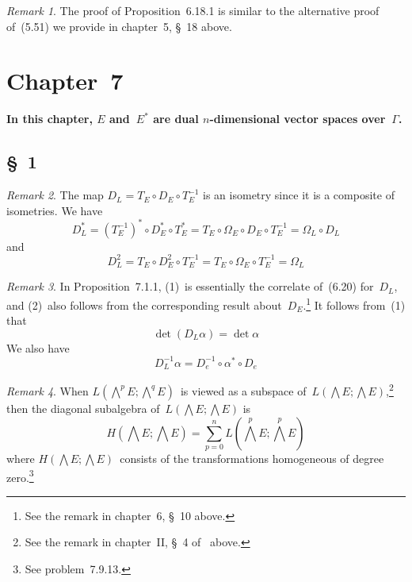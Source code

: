\documentclass[letterpaper,12pt]{article}
\newcommand{\after}{\circ}
\newcommand{\bigeprod}{\bigwedge}
\newcommand{\medeprod}{{\textstyle\bigeprod}}
\theoremstyle{definition}
\theoremstyle{remark}
\newtheorem*{rmk}{Remark}
\begin{document}
\begin{rmk}
The proof of Proposition~6.18.1 is similar to the alternative proof of~(5.51) we provide in chapter~5, \S~18 above.
\end{rmk}

\newpage
\section*{Chapter~7}
{\boldmath\textbf{In this chapter, \(E\) and~\(E^*\) are dual \(n\)-dimensional vector spaces over~\(\Gamma\).}}

\subsection*{\S~1}
\begin{rmk}
The map \(D_L=T_E\after D_E\after T_E^{-1}\) is an isometry since it is a composite of isometries. We have
\[D_L^*=(T_E^{-1})^*\after D_E^*\after T_E^*=T_E\after\Omega_E\after D_E\after T_E^{-1}=\Omega_L\after D_L\]
and
\[D_L^2=T_E\after D_E^2\after T_E^{-1}=T_E\after\Omega_E\after T_E^{-1}=\Omega_L\]
\end{rmk}

\begin{rmk}
In Proposition~7.1.1, (1)~is essentially the correlate of~(6.20) for~\(D_L\), and (2)~also follows from the corresponding result about~\(D_E\).\footnote{See the remark in chapter~6, \S~10 above.} It follows from~(1) that
\[\det(D_L\alpha)=\det\alpha\]
We also have
\[D_L^{-1}\alpha=D_e^{-1}\after\alpha^*\after D_e\]
\end{rmk}

\begin{rmk}
When \(L(\medeprod^p E;\medeprod^q E)\)~is viewed as a subspace of~\(L(\bigeprod E;\bigeprod E)\),\footnote{See the remark in chapter~II, \S~4 of~\cite{greub1} above.} then the diagonal subalgebra of~\(L(\bigeprod E;\bigeprod E)\) is
\[H(\medeprod E;\medeprod E)=\sum_{p=0}^nL(\medeprod^p E;\medeprod^p E)\]
where \(H(\medeprod E;\medeprod E)\)~consists of the transformations homogeneous of degree zero.\footnote{See problem~7.9.13.}
\end{rmk}
\end{document}
